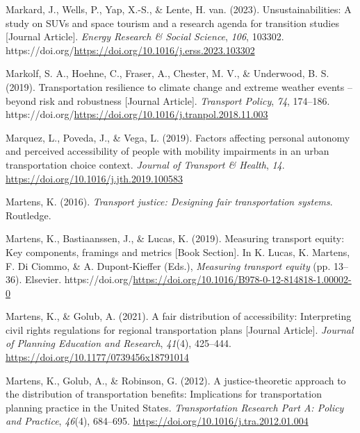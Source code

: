 \documentclass[
  letterpaper,
  DIV=11,
  numbers=noendperiod]{scrartcl}
\newlength{\cslhangindent}
\newenvironment{CSLReferences}[2] %
 {\begin{list}{}{%
  \setlength{\itemindent}{0pt}
  \setlength{\leftmargin}{0pt}
  \setlength{\parsep}{0pt}
  \ifodd #1
   \setlength{\leftmargin}{\cslhangindent}
   \setlength{\itemindent}{-1\cslhangindent}
  \fi
  \setlength{\itemsep}{#2\baselineskip}}}
 {\end{list}}
\begin{document}
\begin{CSLReferences}{1}{0}
Markard, J., Wells, P., Yap, X.-S., \& Lente, H. van. (2023).
Unsustainabilities: A study on SUVs and space tourism and a research
agenda for transition studies {[}Journal Article{]}. \emph{Energy
Research \& Social Science}, \emph{106}, 103302.
https://doi.org/\url{https://doi.org/10.1016/j.erss.2023.103302}

Markolf, S. A., Hoehne, C., Fraser, A., Chester, M. V., \& Underwood, B.
S. (2019). Transportation resilience to climate change and extreme
weather events -- beyond risk and robustness {[}Journal Article{]}.
\emph{Transport Policy}, \emph{74}, 174--186.
https://doi.org/\url{https://doi.org/10.1016/j.tranpol.2018.11.003}

Marquez, L., Poveda, J., \& Vega, L. (2019). Factors affecting personal
autonomy and perceived accessibility of people with mobility impairments
in an urban transportation choice context. \emph{Journal of Transport \&
Health}, \emph{14}. \url{https://doi.org/10.1016/j.jth.2019.100583}

Martens, K. (2016). \emph{Transport justice: Designing fair
transportation systems}. Routledge.

Martens, K., Bastiaanssen, J., \& Lucas, K. (2019). Measuring transport
equity: Key components, framings and metrics {[}Book Section{]}. In K.
Lucas, K. Martens, F. Di Ciommo, \& A. Dupont-Kieffer (Eds.),
\emph{Measuring transport equity} (pp. 13--36). Elsevier.
https://doi.org/\url{https://doi.org/10.1016/B978-0-12-814818-1.00002-0}

Martens, K., \& Golub, A. (2021). A fair distribution of accessibility:
Interpreting civil rights regulations for regional transportation plans
{[}Journal Article{]}. \emph{Journal of Planning Education and
Research}, \emph{41}(4), 425--444.
\url{https://doi.org/10.1177/0739456x18791014}

Martens, K., Golub, A., \& Robinson, G. (2012). A justice-theoretic
approach to the distribution of transportation benefits: {Implications}
for transportation planning practice in the {United States}.
\emph{Transportation Research Part A: Policy and Practice},
\emph{46}(4), 684--695. \url{https://doi.org/10.1016/j.tra.2012.01.004}


\end{CSLReferences}
\end{document}
